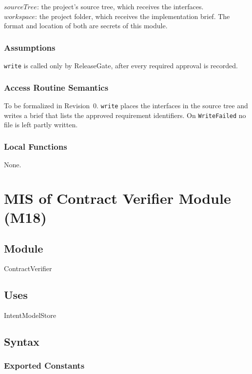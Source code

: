 \documentclass[12pt, titlepage]{article}
\begin{document}
$sourceTree$: the project's source tree, which receives the interfaces.\\
$workspace$: the project folder, which receives the implementation brief. The
format and location of both are secrets of this module.

\subsubsection{Assumptions}

\texttt{write} is called only by ReleaseGate, after every required approval
is recorded.

\subsubsection{Access Routine Semantics}

To be formalized in Revision~0. \texttt{write} places the interfaces in the
source tree and writes a brief that lists the approved requirement identifiers.
On \texttt{WriteFailed} no file is left partly written.

\subsubsection{Local Functions}

None.

\newpage
\section{MIS of Contract Verifier Module (M18)} \label{MISVerify}

\subsection{Module}

ContractVerifier

\subsection{Uses}

IntentModelStore

\subsection{Syntax}

\subsubsection{Exported Constants}
\end{document}
